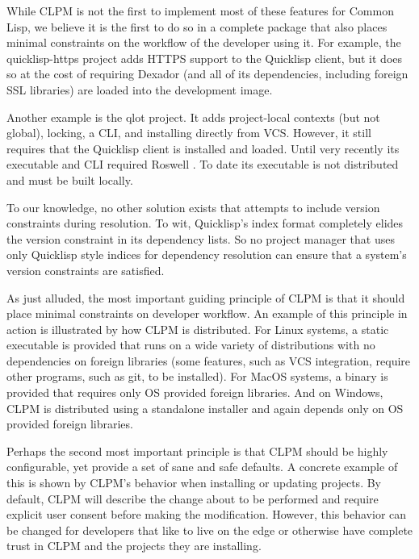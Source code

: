 \documentclass[format=sigconf]{acmart}
\begin{document}
While CLPM is not the first to implement most of these features for Common
Lisp, we believe it is the first to do so in a complete package that also
places minimal constraints on the workflow of the developer using it. For
example, the quicklisp-https \cite{quicklisp-https} project adds HTTPS support
to the Quicklisp client, but it does so at the cost of requiring Dexador
\cite{dexador} (and all of its dependencies, including foreign SSL libraries)
are loaded into the development image.

Another example is the qlot \cite{qlot} project. It adds project-local contexts
(but not global), locking, a CLI, and installing directly from VCS. However, it
still requires that the Quicklisp client is installed and loaded. Until very
recently its executable and CLI required Roswell \cite{roswell}. To date its
executable is not distributed and must be built locally.

To our knowledge, no other solution exists that attempts to include version
constraints during resolution. To wit, Quicklisp's index format completely
elides the version constraint in its dependency lists. So no project manager
that uses only Quicklisp style indices for dependency resolution can ensure
that a system's version constraints are satisfied.

As just alluded, the most important guiding principle of CLPM is that it should
place minimal constraints on developer workflow. An example of this principle
in action is illustrated by how CLPM is distributed. For Linux systems, a
static executable is provided that runs on a wide variety of distributions with
no dependencies on foreign libraries (some features, such as VCS integration,
require other programs, such as git, to be installed). For MacOS systems, a
binary is provided that requires only OS provided foreign libraries. And on
Windows, CLPM is distributed using a standalone installer and again depends
only on OS provided foreign libraries.


Perhaps the second most important principle is that CLPM should be highly
configurable, yet provide a set of sane and safe defaults. A concrete example
of this is shown by CLPM's behavior when installing or updating projects. By
default, CLPM will describe the change about to be performed and require
explicit user consent before making the modification. However, this behavior
can be changed for developers that like to live on the edge or otherwise have
complete trust in CLPM and the projects they are installing.
\end{document}
